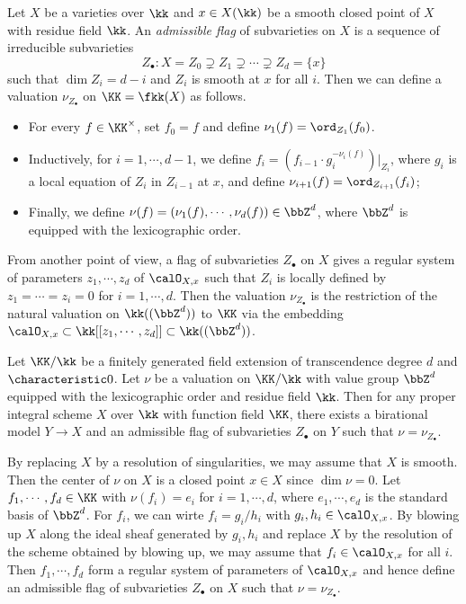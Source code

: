 \begin{example}
	Let $X$ be a varieties over $\kk$ and $x \in X(\kk)$ be a smooth closed point of $X$ with residue field $\kk$.
	An \emph{admissible flag} of subvarieties on $X$ is a sequence of irreducible subvarieties
	\[ Z_\bullet: X = Z_0 \supsetneq Z_1 \supsetneq \cdots \supsetneq Z_d = \{x\} \]
	such that $\dim Z_i = d-i$ and $Z_i$ is smooth at $x$ for all $i$.
	Then we can define a valuation $\nu_{Z_\bullet}$ on $\KK = \fkk(X)$ as follows.
	\begin{itemize}[nosep]
		\item For every $f \in \KK^\times$, set $f_0 = f$ and define $\nu_1(f) = \ord_{Z_1}(f_0)$.
		\item Inductively, for $i = 1,\cdots,d-1$, we define $f_i = \left( f_{i-1} \cdot g_i^{-\nu_i(f)} \right)|_{Z_i}$, where $g_i$ is a local equation of $Z_i$ in $Z_{i-1}$ at $x$, and define $\nu_{i+1}(f) = \ord_{Z_{i+1}}(f_i)$;
		\item Finally, we define $\nu(f) = (\nu_1(f),\cdots,\nu_d(f)) \in \bbZ^d$, where $\bbZ^d$ is equipped with the lexicographic order.
	\end{itemize}

	From another point of view, a flag of subvarieties $Z_\bullet$ on $X$ gives a regular system of parameters $z_1,\cdots,z_d$ of $\calO_{X,x}$ such that $Z_i$ is locally defined by $z_1 = \cdots = z_i = 0$ for $i = 1,\cdots,d$.
	Then the valuation $\nu_{Z_\bullet}$ is the restriction of the natural valuation on $\kk((\bbZ^d))$ to $\KK$ via the embedding $\calO_{X,x} \subset \kk[[z_1,\cdots,z_d]] \subset \kk((\bbZ^d))$.
\end{example}

\begin{remark}
	Let $\KK/\kk$ be a finitely generated field extension of transcendence degree $d$ and $\characteristic 0$.
	Let $\nu$ be a valuation on $\KK/\kk$ with value group $\bbZ^d$ equipped with the lexicographic order and residue field $\kk$.
	Then for any proper integral scheme $X$ over $\kk$ with function field $\KK$, there exists a birational model $Y \to X$ and an admissible flag of subvarieties $Z_\bullet$ on $Y$ such that $\nu = \nu_{Z_\bullet}$.

	By replacing $X$ by a resolution of singularities, we may assume that $X$ is smooth.
	Then the center of $\nu$ on $X$ is a closed point $x \in X$ since $\dim \nu = 0$.
	Let $f_1,\cdots,f_d \in \KK$ with $\nu(f_i) = e_i$ for $i = 1,\cdots,d$, where $e_1,\cdots,e_d$ is the standard basis of $\bbZ^d$.
	For $f_i$, we can wirte $f_i = g_i/h_i$ with $g_i,h_i \in \calO_{X,x}$.
	By blowing up $X$ along the ideal sheaf generated by $g_i,h_i$ and replace $X$ by the resolution of the scheme obtained by blowing up, we may assume that $f_i \in \calO_{X,x}$ for all $i$.
	Then $f_1,\cdots,f_d$ form a regular system of parameters of $\calO_{X,x}$ and hence define an admissible flag of subvarieties $Z_\bullet$ on $X$ such that $\nu = \nu_{Z_\bullet}$.
	\Yang{}
\end{remark}


